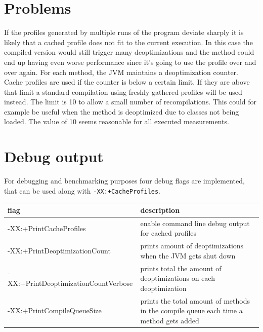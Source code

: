 \section{Problems}
\label{s:problems}
If the profiles generated by multiple runs of the program deviate sharply it is likely that a cached profile does not fit to the current execution. In this case the compiled version would still trigger many deoptimizations and the method could end up having even worse performance since it's going to use the profile over and over again.
For each method, the JVM maintains a deoptimization counter. Cache profiles are used if the counter is below a certain limit. If they are above that limit a standard compilation using freshly gathered profiles will be used instead.
The limit is 10 to allow a small number of recompilations. This could for example be useful when the method is deoptimized due to classes not being loaded. The value of 10 seems reasonable for all executed measurements.
\section{Debug output}
\label{s:debugoutput}
For debugging and benchmarking purposes four debug flags are implemented, that can be used along with \texttt{-XX:+CacheProfiles}.
\begin{table}[ht]
  \centering
  \label{t:debugflags}
  \begin{center}
    \begin{tabular}{| l | p{9.0cm} |}
       \hline
       \textbf{flag} & \textbf{description} \\ \hline\hline
       -XX:+PrintCacheProfiles & enable command line debug output for cached profiles\\ \hline
       -XX:+PrintDeoptimizationCount & prints amount of deoptimizations when the JVM gets shut down\\ \hline
       -XX:+PrintDeoptimizationCountVerbose & prints total the amount of deoptimizations on each deoptimization\\ \hline
       -XX:+PrintCompileQueueSize & prints the total amount of methods in the compile queue each time a method gets added \\ \hline
    \end{tabular}
  \end{center}
\end{table}

 
